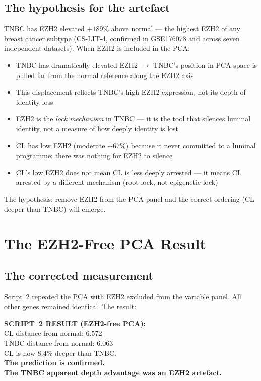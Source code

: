 \documentclass[12pt, a4paper]{article}
\begin{document}
\subsection{The hypothesis for the artefact}

TNBC has EZH2 elevated $+189\%$ above normal ---
the highest EZH2 of any breast cancer subtype
(CS-LIT-4, confirmed in GSE176078 and across
seven independent datasets). When EZH2 is
included in the PCA:

\begin{itemize}
    \item TNBC has dramatically elevated EZH2
    $\rightarrow$ TNBC's position in PCA space
    is pulled far from the normal reference
    along the EZH2 axis
    \item This displacement reflects TNBC's
    high EZH2 expression, not its depth of
    identity loss
    \item EZH2 is the \textit{lock mechanism}
    in TNBC --- it is the tool that silences
    luminal identity, not a measure of how
    deeply identity is lost
    \item CL has low EZH2 (moderate $+67\%$)
    because it never committed to a luminal
    programme: there was nothing for EZH2
    to silence
    \item CL's low EZH2 does not mean CL is
    less deeply arrested --- it means CL
    arrested by a different mechanism
    (root lock, not epigenetic lock)
\end{itemize}

The hypothesis: remove EZH2 from the PCA panel
and the correct ordering (CL deeper than TNBC)
will emerge.

\section{The EZH2-Free PCA Result}

\subsection{The corrected measurement}

Script~2 repeated the PCA with EZH2 excluded
from the variable panel. All other genes remained
identical. The result:

\begin{center}
\colorbox{correctedbox}{
\begin{minipage}{0.88\textwidth}
\vspace{0.5em}
\textbf{SCRIPT~2 RESULT (EZH2-free PCA):}\\[0.4em]
CL distance from normal: $\mathbf{6.572}$\\
TNBC distance from normal: $\mathbf{6.063}$\\[0.3em]
CL is now $8.4\%$ deeper than TNBC.\\[0.3em]
\textbf{The prediction is confirmed.}\\
\textbf{The TNBC apparent depth advantage
was an EZH2 artefact.}
\vspace{0.5em}
\end{minipage}}
\end{center}
\end{document}

